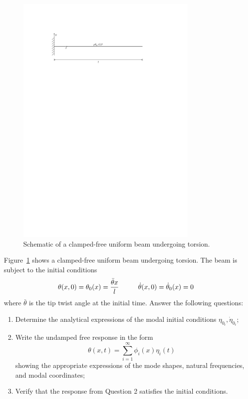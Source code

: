 \documentclass[11pt,a4paper]{article}
\begin{document}
\begin{figure}[htpt!]
	\centering
	\includegraphics[width=0.8\textwidth]{figures/beam2.pdf}
	\caption{Schematic of a clamped-free uniform beam undergoing torsion.}
	\label{f2}
\end{figure}
%
Figure~\ref{f2} shows a clamped-free uniform beam undergoing torsion. The beam is subject to the initial conditions
%
\begin{equation} \label{p2-e1}
	\theta(x,0) = \theta_0(x) = \frac{\bar{\theta} x}{l} \hspace{10mm} 
	\dot{\theta}(x,0) = \dot{\theta}_0(x) = 0
\end{equation}
%
where $\bar{\theta}$ is the tip twist angle at the initial time. Answer the following questions:
%
\begin{enumerate}
	\item Determine the analytical expressions of the modal initial conditions $\eta_{0_i}, \dot{\eta}_{0_i}$;
	\item Write the undamped free response in the form
	\begin{equation} \label{p2-e2}
		\theta(x,t) = \sum_{i=1}^{\infty} \phi_i(x) \eta_i(t)
	\end{equation}
	showing the appropriate expressions of the mode shapes, natural frequencies, and modal coordinates;
	\item Verify that the response from Question 2 satisfies the initial conditions.
\end{enumerate}
\end{document}

